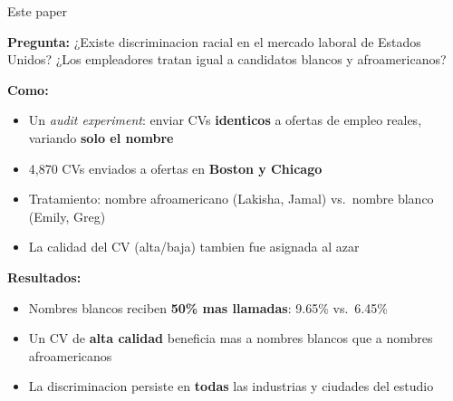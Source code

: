 \documentclass[aspectratio=169, 11pt]{beamer}
\begin{document}
\begin{frame}{Este paper}
\small

\textcolor{javeriana}{\textbf{Pregunta:}} ¿Existe discriminacion racial en el mercado laboral de Estados Unidos? ¿Los empleadores tratan igual a candidatos blancos y afroamericanos?

\vspace{0.8em}

\textcolor{javeriana}{\textbf{Como:}}
\begin{itemize}\scriptsize\setlength{\itemsep}{1pt}
  \item Un \textit{audit experiment}: enviar CVs \textbf{identicos} a ofertas de empleo reales, variando \textbf{solo el nombre}
  \item 4{,}870 CVs enviados a ofertas en \textbf{Boston y Chicago}
  \item Tratamiento: nombre afroamericano (Lakisha, Jamal) vs.\ nombre blanco (Emily, Greg)
  \item La calidad del CV (alta/baja) tambien fue asignada al azar
\end{itemize}

\vspace{0.5em}

\textcolor{javeriana}{\textbf{Resultados:}}
\begin{itemize}\scriptsize\setlength{\itemsep}{1pt}
  \item Nombres blancos reciben \textbf{50\% mas llamadas}: 9.65\% vs.\ 6.45\%
  \item Un CV de \textbf{alta calidad} beneficia mas a nombres blancos que a nombres afroamericanos
  \item La discriminacion persiste en \textbf{todas} las industrias y ciudades del estudio
\end{itemize}
\end{frame}
\end{document}
